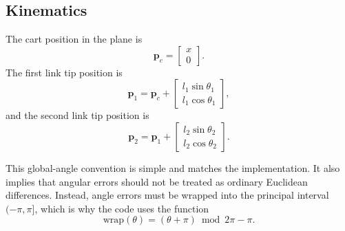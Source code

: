 \documentclass[conference]{IEEEtran}
\begin{document}
\subsection{Kinematics}
The cart position in the plane is
\begin{equation}
\bm{p}_c =
\begin{bmatrix}
x \\ 0
\end{bmatrix}.
\end{equation}
The first link tip position is
\begin{equation}
\bm{p}_1 = \bm{p}_c +
\begin{bmatrix}
l_1 \sin \theta_1 \\
l_1 \cos \theta_1
\end{bmatrix},
\end{equation}
and the second link tip position is
\begin{equation}
\bm{p}_2 = \bm{p}_1 +
\begin{bmatrix}
l_2 \sin \theta_2 \\
l_2 \cos \theta_2
\end{bmatrix}.
\end{equation}

This global-angle convention is simple and matches the implementation. It also implies that angular errors should not be treated as ordinary Euclidean differences. Instead, angle errors must be wrapped into the principal interval $(-\pi,\pi]$, which is why the code uses the function
\begin{equation}
\mathrm{wrap}(\theta) = (\theta + \pi)\bmod 2\pi - \pi.
\end{equation}
\end{document}
